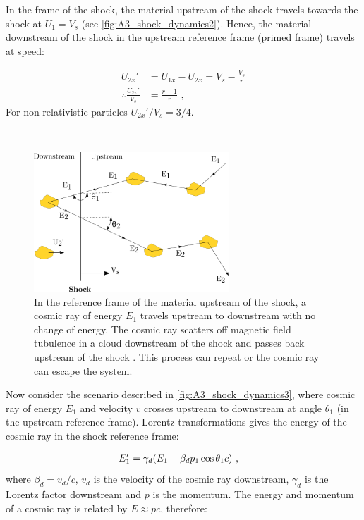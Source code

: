 In the frame of the shock, the material upstream of the shock travels towards the shock at $U_1=V_s$ (see \autoref{fig:A3_shock_dynamics2}). Hence, the material downstream of the shock in the upstream reference frame (primed frame) travels at speed:

\begin{equation}
    \begin{aligned}
        U_{2x}'&=U_{1x}-U_{2x} =V_s- \frac{V_s}{r} \\
        \therefore \frac{U_{2x}'}{V_s}&=\frac{r-1}{r}\text{ ,}
    \end{aligned} \label{eq:down_upstream_v_ratio}
\end{equation}
\noindent For non-relativistic particles ${U_{2x}'}/{V_s}=3/4$.
\par~\par 
\begin{figure}
	\centering
	\includegraphics[width=0.65\textwidth]{A3_Diffusive_Shock_Acceleration/Images/dsa.png}
	\caption{In the reference frame of the material upstream of the shock, a cosmic ray of energy $E_1$ travels upstream to downstream with no change of energy. The cosmic ray scatters off magnetic field tubulence in a  cloud downstream of the shock and passes back upstream of the shock . This process can repeat or the cosmic ray can escape the system.}
	\label{fig:A3_shock_dynamics3}
\end{figure}

Now consider the scenario described in \autoref{fig:A3_shock_dynamics3}, where cosmic ray of energy $E_1$ and velocity $v$ crosses upstream to downstream at angle $\theta_1$ (in the upstream reference frame). Lorentz transformations gives the energy of the cosmic ray in the shock reference frame:

\begin{equation}
    \begin{aligned}
        E_1'&=\gamma_d\qty(E_1-\beta_d p_1\cos\theta_1 c)\text{ ,}
    \end{aligned}
\end{equation}
\noindent where $\beta_d=v_d/c$, $v_d$ is the velocity of the cosmic ray downstream, $\gamma_d$ is the Lorentz factor downstream and $p$ is the momentum. The energy and momentum of a cosmic ray is related by $E\approx pc$, therefore:

